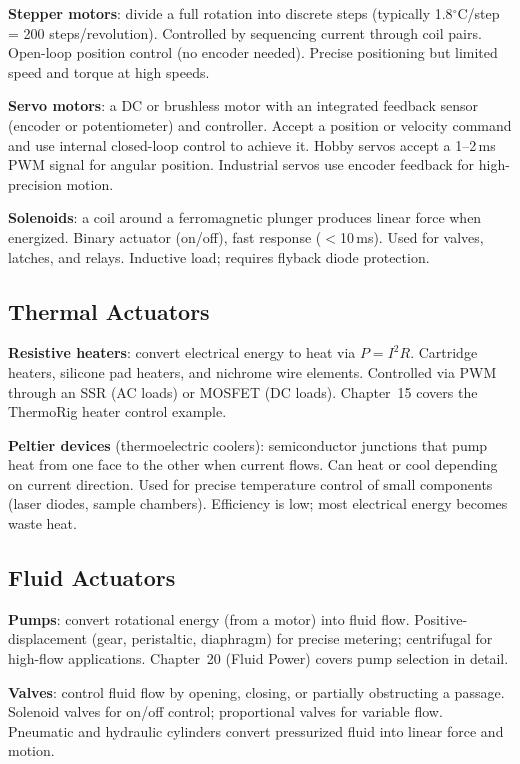 \documentclass[11pt,letterpaper,twoside,openany]{book}
\newcommand{\degC}{\ensuremath{{}^{\circ}\text{C}}}
\begin{document}
\textbf{Stepper motors}: divide a full rotation into discrete steps (typically 1.8\degC{}/step = 200 steps/revolution). Controlled by sequencing current through coil pairs. Open-loop position control (no encoder needed). Precise positioning but limited speed and torque at high speeds.

\textbf{Servo motors}: a DC or brushless motor with an integrated feedback sensor (encoder or potentiometer) and controller. Accept a position or velocity command and use internal closed-loop control to achieve it. Hobby servos accept a 1--2\,ms PWM signal for angular position. Industrial servos use encoder feedback for high-precision motion.

\textbf{Solenoids}: a coil around a ferromagnetic plunger produces linear force when energized. Binary actuator (on/off), fast response ($<$10\,ms). Used for valves, latches, and relays. Inductive load; requires flyback diode protection.

\subsection{Thermal Actuators}
\textbf{Resistive heaters}: convert electrical energy to heat via $P = I^2R$. Cartridge heaters, silicone pad heaters, and nichrome wire elements. Controlled via PWM through an SSR (AC loads) or MOSFET (DC loads). Chapter~15 covers the ThermoRig heater control example.

\textbf{Peltier devices} (thermoelectric coolers): semiconductor junctions that pump heat from one face to the other when current flows. Can heat or cool depending on current direction. Used for precise temperature control of small components (laser diodes, sample chambers). Efficiency is low; most electrical energy becomes waste heat.

\subsection{Fluid Actuators}
\textbf{Pumps}: convert rotational energy (from a motor) into fluid flow. Positive-displacement (gear, peristaltic, diaphragm) for precise metering; centrifugal for high-flow applications. Chapter~20 (Fluid Power) covers pump selection in detail.

\textbf{Valves}: control fluid flow by opening, closing, or partially obstructing a passage. Solenoid valves for on/off control; proportional valves for variable flow. Pneumatic and hydraulic cylinders convert pressurized fluid into linear force and motion.
\end{document}
